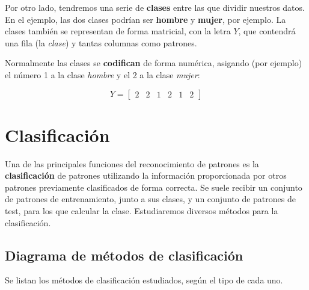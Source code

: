 \documentclass[11pt]{scrartcl}
\begin{document}
Por otro lado, tendremos una serie de \textbf{clases} entre las que dividir
nuestros datos. En el ejemplo, las dos clases podrían ser \textbf{hombre} y
\textbf{mujer}, por ejemplo. La clases también se representan de forma
matricial, con la letra $Y$, que contendrá una fila (la \textit{clase}) y tantas
columnas como patrones. 

Normalmente las clases se \textbf{codifican} de forma numérica, asigando (por
ejemplo) el número 1 a la clase \textit{hombre} y el 2 a la clase
\textit{mujer}:

$$
Y = \begin{bmatrix}
2 & 2 & 1 & 2 & 1 & 2
\end{bmatrix}
$$



\section{Clasificación}

Una de las principales funciones del reconocimiento de patrones es la
\textbf{clasificación} de patrones utilizando la información proporcionada por
otros patrones previamente clasificados de forma correcta. Se suele recibir un
conjunto de patrones de entrenamiento, junto a sus clases, y un conjunto de
patrones de test, para los que calcular la clase. Estudiaremos diversos métodos
para la clasificación.

\subsection{Diagrama de métodos de clasificación}

Se listan los métodos de clasificación estudiados, según el tipo de cada uno.

\bigskip

\schema
{%
}
{%
  \schema
  {%
  }
  {%
    \schema
    {
    }
    {
      \schema
      {
      }
      {
      }

      \schema
      {
      }
      {
      }
    }
  }

  \schema
  {%
  }
  {
  }
}
\end{document}
